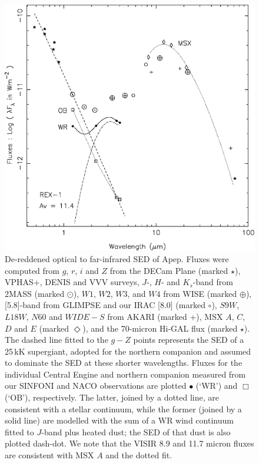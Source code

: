 \documentclass[preprint,times]{aastex61}
\begin{document}
\begin{figure}
\renewcommand\figurename{Supplementary Information Figure}
\begin{center}
    \includegraphics[scale=0.6]{sed_photo_ir_crop.eps}
    \caption{De-reddened optical to far-infrared SED of Apep. Fluxes were computed from $g$, $r$, $i$ and $Z$ from the DECam Plane (marked $\star$), VPHAS+, DENIS and VVV surveys, $J$-, $H$- and $K_s$-band from 2MASS (marked $\odot$), $W1$, $W2$, $W3$, and $W4$ from WISE (marked $\oplus$), [5.8]-band from GLIMPSE and our IRAC [8.0] (marked $\circ$), $S9W$, $L18W$, $N60$ and $WIDE-S$ from AKARI (marked +), MSX $A$, $C$, $D$ and $E$ (marked $\Diamond$), and the 70-micron Hi-GAL flux (marked $\star$). The dashed line fitted to the $g-Z$ points represents the SED of a 25\,kK supergiant, adopted for the northern companion and assumed to dominate the SED at these shorter wavelengths. Fluxes for the individual Central Engine and northern companion measured from our SINFONI and NACO observations are plotted $\bullet$ (`WR') and $\Box$ (`OB'), respectively. The latter, joined by a dotted line, are consistent with a stellar continuum, while the former (joined by a solid line) are modelled with the sum of a WR wind continuum fitted to $J$-band plus heated dust; the SED of that dust is also plotted dash-dot. We note that the VISIR 8.9 and 11.7 micron fluxes are consistent with MSX $A$ and the dotted fit.}
    \label{fig:sed_ir}
\end{center}
\end{figure}
\end{document}
